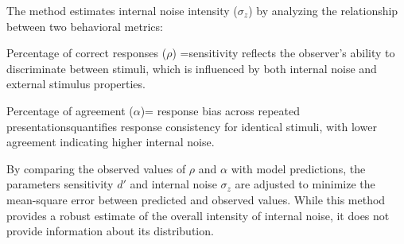 The method estimates internal noise intensity ($\sigma_z$) by analyzing the relationship between two behavioral metrics:

Percentage of correct responses ($\rho$) =sensitivity  reflects the observer’s ability to discriminate between stimuli, which is influenced by both internal noise and external stimulus properties.


Percentage of agreement  ($\alpha$)= response bias across repeated presentationsquantifies response consistency for identical stimuli, with lower agreement indicating higher internal noise.


By comparing the observed values of $\rho$ and $\alpha$ with model predictions, the parameters sensitivity $d'$  and internal noise $\sigma_z$ are adjusted to minimize the mean-square error between predicted and observed values. While this method provides a robust estimate of the overall intensity of internal noise, it does not provide information about its distribution. \cite{neri_how_2010, neri_statistical_2013}

